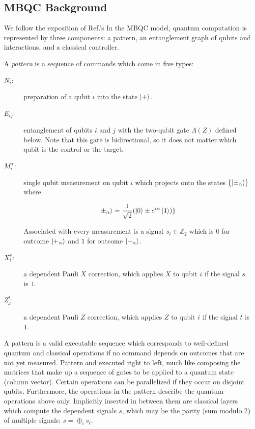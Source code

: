 \subsection{MBQC Background}
\label{subsec:mbqc-bg}

We follow the exposition of Ref.'s \cite{Broadbent2007,DaSilva2013}
In the MBQC model, quantum computation is represented by three components:
a pattern, an entanglement graph of qubits and interactions, and a
classical controller.

A \emph{pattern} is a sequence of commands which come in five types:

\begin{description}
\item[$N_i$:]
preparation of a qubit $i$ into the state $\left\vert{+}\right\rangle$.

\item[$E_{ij}$:]
entanglement of qubits $i$ and $j$ with the two-qubit gate
$\Lambda(Z)$ defined below. Note that this gate is bidirectional, so it
does not matter which qubit is the control or the target.

\item[$M^{\alpha}_i$:] single qubit measurement on qubit $i$ which
projects onto the states
$\{ \left\vert{\pm_{\alpha}}\right\rangle \}$ where

\begin{equation}
\left\vert{\pm_{\alpha}}\right\rangle = \frac{1}{\sqrt{2}}(\left\vert{0}\right\rangle \pm e^{i\alpha}\left\vert{1}\right\rangle)\}
\end{equation}

Associated with every measurement is a signal $s_i \in \mathbb{Z}_2$
which is $0$ for outcome $\left\vert{+_{\alpha}}\right\rangle$ and $1$ for outcome
$\left\vert{-_{\alpha}}\right\rangle$.

\item[$X^{s}_i$:] a dependent Pauli $X$ correction, which applies $X$ to
qubit $i$ if the signal $s$ is $1$.

\item[$Z^{t}_j$:] a dependent Pauli $Z$ correction, which applies $Z$ to
qubit $i$ if the signal $t$ is $1$.

\end{description}

A pattern is a valid executable sequence which corresponds to well-defined
quantum and classical operations if no command depends on outcomes that
are not yet measured. Pattern and executed right to left, much like
composing the matrices that make up a sequence of gates to be applied to
a quantum state (column vector). Certain operations can be parallelized
if they occur on disjoint qubits. Furthermore, the operations in the
pattern describe the quantum operations above only. Implicitly inserted
in between them are classical layers which compute the dependent signals
$s$, which may be the parity
(sum modulo 2) of multiple signals: $s = \oplus_i s_i$.

